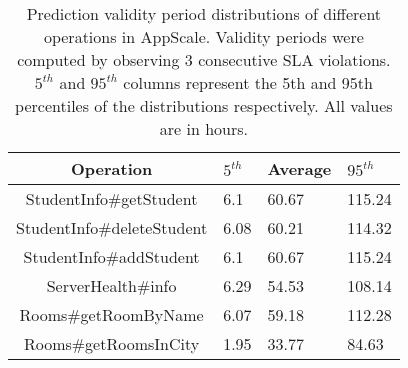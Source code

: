 \begin{table}
\caption{Prediction validity period distributions of different operations in
AppScale. Validity periods were computed by observing $3$ consecutive SLA
violations. $5^{th}$ and $95^{th}$ 
columns represent the 5th and 95th percentiles of the
distributions respectively. All values are in hours.
\label{tab:as_validity}
}
\begin{center}
\begin{tabular}{|c|p{1cm}|p{1cm}|p{1cm}|}
\hline
Operation & $5^{th}$ & Average & $95^{th}$ \\ \hline
StudentInfo\#getStudent & 6.1 & 60.67 & 115.24 \\ \hline
StudentInfo\#deleteStudent & 6.08 & 60.21 & 114.32 \\ \hline
StudentInfo\#addStudent & 6.1 & 60.67 & 115.24 \\ \hline
ServerHealth\#info & 6.29 & 54.53 & 108.14 \\ \hline
Rooms\#getRoomByName & 6.07 & 59.18 & 112.28 \\ \hline
Rooms\#getRoomsInCity & 1.95 & 33.77 & 84.63 \\ \hline
\end{tabular}
\end{center}
\vspace{-0.2in}
\end{table}



